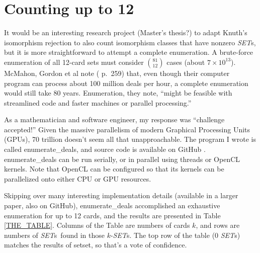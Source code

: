 \documentclass{article}
\theoremstyle{theorem}
\theoremstyle{definition}
\newcommand{\SETs}{{\em SET}s}
\newcommand{\SETSET}{{\sc setset}}
\newcommand{\ED}{{\sc enumerate\_deals}}
\newcommand{\EDb}{{\sc enumerate\_deals }}
\begin{document}
\section{Counting up to 12}
It would be an interesting research project (Master's thesis?) to adapt Knuth's
isomorphism rejection to also count isomorphism classes that have nonzero \SETs,
but it is more straightforward to attempt a complete enumeration. A brute-force
enumeration of all 12-card sets must consider $\binom{81}{12}$ cases (about
$7\times 10^{13}$). McMahon, Gordon et al note (\cite{JOS} p.~259) that, even
though their computer program can process about 100 million deals per hour, a
complete enumeration would still take 80 years. Enumeration, they note, ``might
be feasible with streamlined code and faster machines or parallel processing.''

As a mathematician and software engineer, my response was ``challenge
accepted!'' Given the massive parallelism of modern Graphical Processing Units
(GPUs), 70 trillion doesn't seem all that unapproachable. The program I wrote is
called \ED, and source code is available on GitHub \cite{ME}. \EDb can be run
serially, or in parallel using threads or OpenCL \cite{OPENCL} kernels. Note
that OpenCL can be configured so that its kernels can be parallelized onto
either CPU or GPU resources.

Skipping over many interesting implementation details (available in a larger
paper, also on GitHub), \EDb accomplished an exhaustive enumeration for up to 12
cards, and the results are presented in Table \ref{THE_TABLE}. Columns of the
Table are numbers of cards $k$, and rows are numbers of \SETs~found in those
$k$-\SETs.  The top row of the table (0 \SETs) matches the results of \SETSET,
so that's a vote of confidence.
\end{document}
